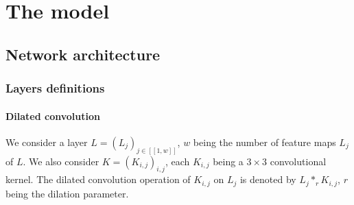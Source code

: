 \documentclass{article}
\begin{document}
\section{The model}
    \subsection{Network architecture}
        \subsubsection{Layers definitions}

            \paragraph{Dilated convolution}\label{par:dilated} We consider a layer $L=(L_j)_{j\in [\![1,w]\!]}$, $w$ being the number of feature maps $L_j$ of $L$. We also consider $K=(K_{i,j})_{i,j}$, each $K_{i,j}$ being a $3\times 3$ convolutional kernel. The dilated convolution operation of $K_{i,j}$ on $L_j$ is denoted by $L_j*_r K_{i,j}$, $r$ being the dilation parameter.
\end{document}
